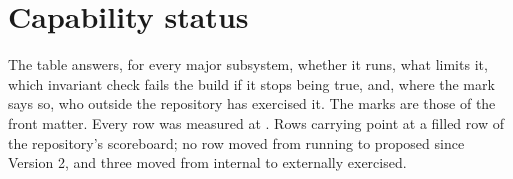 \section{Capability status}
\label{app:status}

The table answers, for every major subsystem, whether it runs, what limits it, which invariant
check fails the build if it stops being true, and, where the mark says so, who outside the
repository has exercised it. The marks are those of the front matter. Every row was measured at
. Rows carrying \sWit{} point at a filled row of the repository's scoreboard; no row
moved from running to proposed since Version 2, and three moved from internal to externally
exercised.

